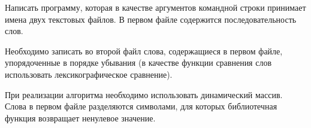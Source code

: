 

Написать программу, которая в качестве аргументов командной строки
принимает имена двух текстовых файлов. В первом файле содержится
последовательность слов.

Необходимо записать во второй файл слова,
содержащиеся в первом файле, упорядоченные в порядке убывания (в
качестве функции сравнения слов использовать лексикографическое
сравнение).

При реализации алгоритма необходимо использовать
динамический массив. Слова в первом файле разделяются символами, для
которых библиотечная функция  возвращает ненулевое значение.
